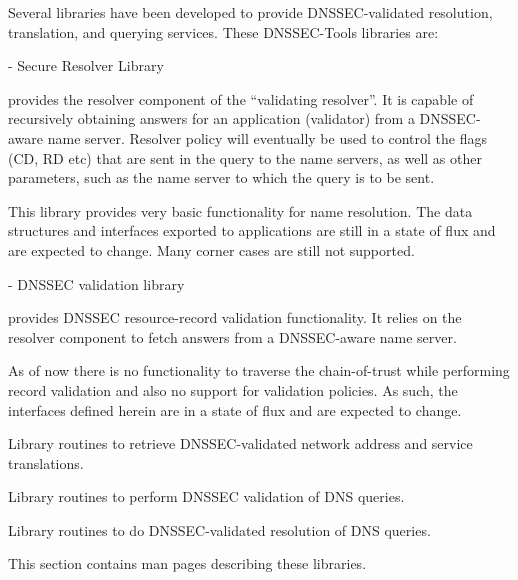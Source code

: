 
Several libraries have been developed to provide DNSSEC-validated resolution,
translation, and querying services.  These DNSSEC-Tools libraries are:

\begin{description}

\item{} - Secure Resolver Library

 provides the resolver component of the ``validating resolver''.
It is capable of recursively obtaining answers for an application (validator)
from a DNSSEC-aware name server.  Resolver policy will eventually be used to
control the flags (CD, RD etc) that are sent in the query to the name servers,
as well as other parameters, such as the name server to which the query is
to be sent.

This library provides very basic functionality for name resolution.  The data
structures and interfaces exported to applications are still in a state of
flux and are expected to change. Many corner cases are still not supported.

\item{} - DNSSEC validation library

 provides DNSSEC resource-record validation functionality.  It
relies on the resolver component to fetch answers from a DNSSEC-aware name
server.

As of now there is no functionality to traverse the chain-of-trust while
performing record validation and also no support for validation policies.
As such, the interfaces defined herein are in a state of flux and are
expected to change.

\item{}

Library routines to retrieve DNSSEC-validated network address and service
translations.

\item{}

Library routines to perform DNSSEC validation of DNS queries.

\item{}

Library routines to do DNSSEC-validated resolution of DNS queries.

\end{description}

This section contains man pages describing these libraries.






